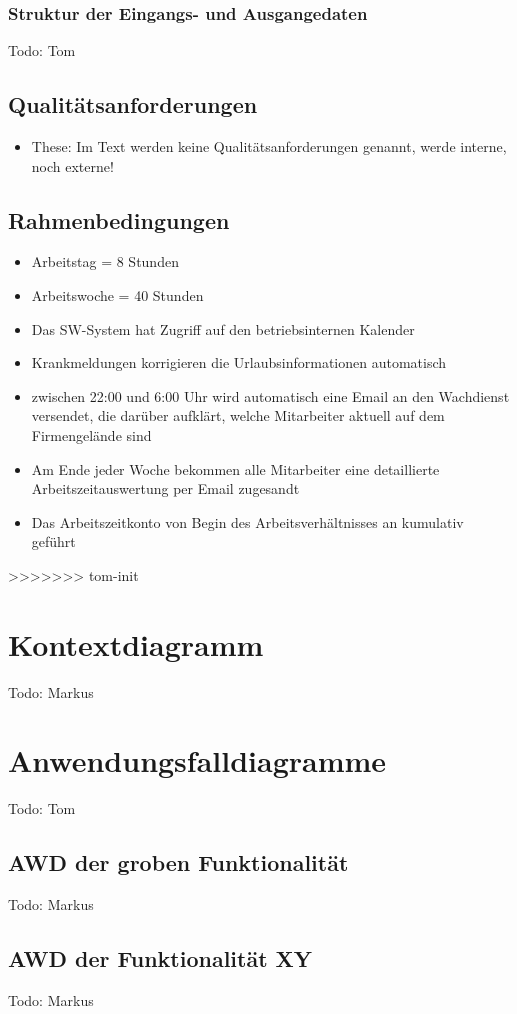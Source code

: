 \subsection{Struktur der Eingangs- und Ausgangedaten}
Todo: Tom
\section{Qualit\"atsanforderungen}
\begin{itemize}
\item \Large
These: Im Text werden keine Qualit\"atsanforderungen genannt, werde interne, noch externe! 
\end{itemize}
\newpage
\section{Rahmenbedingungen}

\begin{itemize}
	\item Arbeitstag  =  8 Stunden
	\item Arbeitswoche = 40 Stunden
	\item Das SW-System hat Zugriff auf den betriebsinternen Kalender
	\item Krankmeldungen korrigieren die Urlaubsinformationen automatisch
	\item zwischen 22:00 und 6:00 Uhr wird automatisch eine Email an den Wachdienst versendet, die dar\"uber aufkl\"art, welche Mitarbeiter aktuell auf dem Firmengel\"ande sind
	\item Am Ende jeder Woche bekommen alle Mitarbeiter eine detaillierte Arbeitszeitauswertung per Email zugesandt
	\item Das Arbeitszeitkonto von Begin des Arbeitsverh\"altnisses an kumulativ gef\"uhrt 
\end{itemize}


>>>>>>> tom-init
\chapter{Kontextdiagramm}
Todo: Markus
\chapter{Anwendungsfalldiagramme}
Todo: Tom
\section{AWD der groben Funktionalität}
Todo: Markus
\section{AWD der Funktionalität XY}
Todo: Markus
